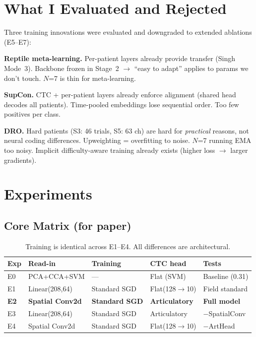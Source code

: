 \documentclass[11pt, letterpaper]{article}
\begin{document}
\section{What I Evaluated and Rejected}
\label{sec:rejected}

Three training innovations were evaluated and downgraded to extended ablations (E5--E7):

\textbf{Reptile meta-learning.} Per-patient layers already provide transfer (Singh Mode~3). Backbone frozen in Stage~2 $\to$ ``easy to adapt'' applies to params we don't touch. $N$=7 is thin for meta-learning.

\textbf{SupCon.} CTC + per-patient layers already enforce alignment (shared head decodes all patients). Time-pooled embeddings lose sequential order. Too few positives per class.

\textbf{DRO.} Hard patients (S3: 46 trials, S5: 63 ch) are hard for \emph{practical} reasons, not neural coding differences. Upweighting = overfitting to noise. $N$=7 running EMA too noisy. Implicit difficulty-aware training already exists (higher loss $\to$ larger gradients).


\section{Experiments}
\label{sec:experiments}

\subsection{Core Matrix (for paper)}

\begin{table}[h]
\centering\small
\begin{tabular}{@{}lllll@{}}
\toprule
\textbf{Exp} & \textbf{Read-in} & \textbf{Training} & \textbf{CTC head} & \textbf{Tests} \\
\midrule
E0 & PCA+CCA+SVM & --- & Flat (SVM) & Baseline (0.31) \\
E1 & Linear(208,64) & Standard SGD & Flat(128$\to$10) & Field standard \\
\textbf{E2} & \textbf{Spatial Conv2d} & \textbf{Standard SGD} & \textbf{Articulatory} & \textbf{Full model} \\
E3 & Linear(208,64) & Standard SGD & Articulatory & $-$SpatialConv \\
E4 & Spatial Conv2d & Standard SGD & Flat(128$\to$10) & $-$ArtHead \\
\bottomrule
\end{tabular}
\caption{Training is identical across E1--E4. All differences are architectural.}
\end{table}
\end{document}

